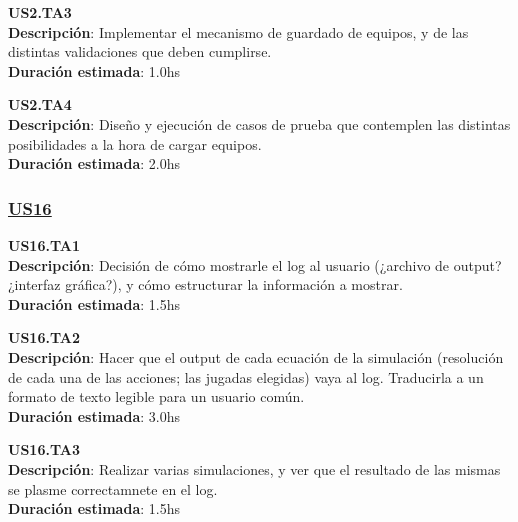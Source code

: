 \begin{tcolorbox}
\textbf{US2.TA3} \\
\textbf{Descripción}: Implementar el mecanismo de guardado de equipos, y de las distintas validaciones que deben cumplirse.\\
\textbf{Duración estimada}: 1.0hs
\end{tcolorbox}
\vspace{10pt}


\begin{tcolorbox}
\textbf{US2.TA4} \\
\textbf{Descripción}: Diseño y ejecución de casos de prueba que contemplen las distintas posibilidades a la hora de cargar equipos.\\
\textbf{Duración estimada}: 2.0hs
\end{tcolorbox}
\vspace{10pt}

\subsubsection*{\underline{US16}}

\begin{tcolorbox}
\textbf{US16.TA1} \\
\textbf{Descripción}:  Decisión de cómo mostrarle el log al usuario (¿archivo de output? ¿interfaz gráfica?), y cómo estructurar la información a mostrar. \\
\textbf{Duración estimada}: 1.5hs
\end{tcolorbox}
\vspace{10pt}

\begin{tcolorbox}
\textbf{US16.TA2} \\
\textbf{Descripción}: Hacer que el output de cada ecuación de la simulación (resolución de cada una de las acciones; las jugadas elegidas) vaya al log. Traducirla a un formato de texto legible para un usuario común.\\
\textbf{Duración estimada}: 3.0hs
\end{tcolorbox}
\vspace{10pt}

\begin{tcolorbox}
\textbf{US16.TA3} \\
\textbf{Descripción}: Realizar varias simulaciones, y ver que el resultado de las mismas se plasme correctamnete en el log.\\
\textbf{Duración estimada}: 1.5hs
\end{tcolorbox}
\vspace{10pt}



